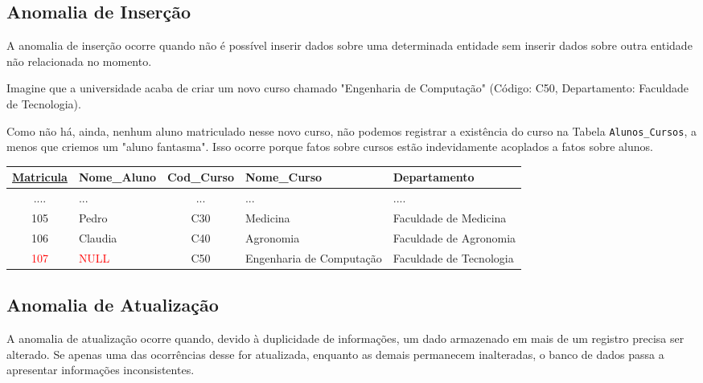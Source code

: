 \subsection{Anomalia de Inserção}
A anomalia de inserção ocorre quando não é possível inserir dados sobre uma determinada entidade sem  inserir dados sobre outra entidade não relacionada no momento.\cite{ramakrishnan2011}

\begin{tcolorbox}[breakable, colback=blue!5,colframe=blue!40!black,title=Situação exemplo]

    Imagine que a universidade acaba de criar um novo curso chamado "Engenharia de Computação" (Código: C50, Departamento: Faculdade de Tecnologia). 
    
    Como não há, ainda, nenhum aluno matriculado nesse novo curso, não podemos registrar a existência do curso na Tabela \texttt{Alunos\_Cursos}, a menos que criemos um "aluno fantasma". Isso ocorre porque fatos sobre cursos estão indevidamente acoplados a fatos sobre alunos.

    \vspace{0.5cm}

    \centering
    \renewcommand{\arraystretch}{1.2}

    \begin{adjustbox}{max width=\textwidth}
    \begin{tabular}{|c|l|c|l|l|}
    \hline
    \textbf{\underline{Matricula}} & \textbf{Nome\_Aluno} & \textbf{Cod\_Curso} & \textbf{Nome\_Curso} & \textbf{Departamento} \\ \hline
    .... & ... & ... & ... & .... \\ \hline
    105 & Pedro & C30 & Medicina & Faculdade de Medicina \\ \hline
    106 & Claudia & C40 & Agronomia & Faculdade de Agronomia \\ \hline
    \textcolor{red}{107} & \textcolor{red}{NULL} & C50 & Engenharia de Computação & Faculdade de Tecnologia \\ \hline
    \end{tabular}
\end{adjustbox}
\label{tab:anomaliains_exemplo}

\end{tcolorbox}

\subsection{Anomalia de Atualização}
A anomalia de atualização ocorre quando, devido à duplicidade de informações, um dado armazenado em mais de um registro precisa ser alterado. Se apenas uma das ocorrências desse for atualizada, enquanto as demais permanecem inalteradas, o banco de dados passa a apresentar informações inconsistentes.\cite{ramakrishnan2011}

